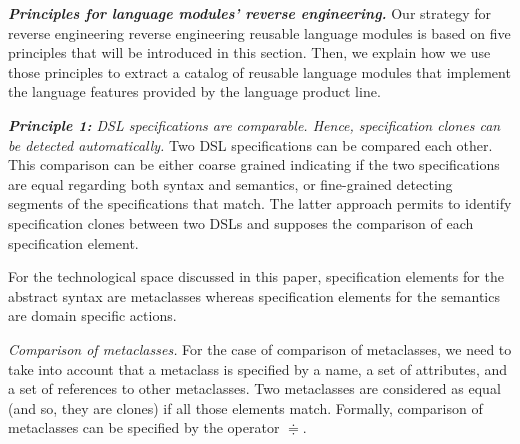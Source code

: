 

\vspace{2mm}
\textit{\textbf{Principles for language modules' reverse engineering.}} Our strategy for reverse engineering reverse engineering reusable language modules is based on five principles that will be introduced in this section. Then, we explain how we use those principles to extract a catalog of reusable language modules that implement the language features provided by the language product line.

\vspace{2mm}
\textit{\textbf{Principle 1:} DSL specifications are comparable. Hence, specification clones can be detected automatically.} Two DSL specifications can be compared each other. This comparison can be either coarse grained indicating if the two specifications are equal regarding both syntax and semantics, or fine-grained detecting segments of the specifications that match. The latter approach permits to identify specification clones between two DSLs and supposes the comparison of each specification element.

For the technological space discussed in this paper, specification elements for the abstract syntax are metaclasses whereas specification elements for the semantics are domain specific actions. 

\vspace{2mm}
\textit{Comparison of metaclasses.} For the case of comparison of metaclasses, we need to take into account that a metaclass is specified by a name, a set of attributes, and a set of references to other metaclasses. Two metaclasses are considered as equal (and so, they are clones) if all those elements match. Formally, comparison of metaclasses can be specified by the operator $\doteqdot$. %

